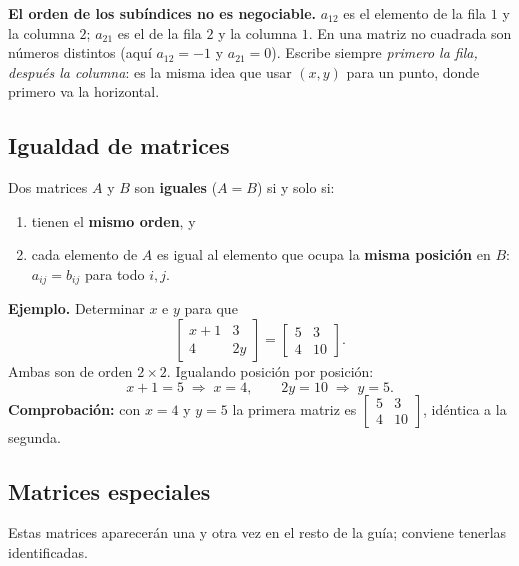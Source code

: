 \documentclass[12pt, letterpaper]{article}
\newcommand{\mwmat}[1]{\ensuremath{\begin{bmatrix}#1\end{bmatrix}}}
\begin{document}
\begin{cuadroadvertencia}
  \small
  \textbf{El orden de los subíndices no es negociable.} $a_{12}$ es el
  elemento de la fila $1$ y la columna $2$; $a_{21}$ es el de la fila $2$ y
  la columna $1$. En una matriz no cuadrada son números distintos (aquí
  $a_{12}=-1$ y $a_{21}=0$). Escribe siempre \emph{primero la fila, después
  la columna}: es la misma idea que usar $(x,y)$ para un punto, donde
  primero va la horizontal.
\end{cuadroadvertencia}

\subsection*{Igualdad de matrices}

\begin{cuadroteoria}
  \small
  Dos matrices $A$ y $B$ son \textbf{iguales} ($A=B$) si y solo si:
  \begin{enumerate}[leftmargin=1.4em, nosep]
    \item tienen el \textbf{mismo orden}, y
    \item cada elemento de $A$ es igual al elemento que ocupa la
          \textbf{misma posición} en $B$: $a_{ij}=b_{ij}$ para todo $i,j$.
  \end{enumerate}
\end{cuadroteoria}

\begin{cuadrosolucion}
  \small
  \textbf{Ejemplo.} Determinar $x$ e $y$ para que
  \[
    \mwmat{x+1 & 3\\ 4 & 2y}=\mwmat{5 & 3\\ 4 & 10}.
  \]
  Ambas son de orden $2\times2$. Igualando posición por posición:
  \[
    x+1=5\;\Rightarrow\;x=4,
    \qquad 2y=10\;\Rightarrow\;y=5.
  \]
  \textbf{Comprobación:} con $x=4$ y $y=5$ la primera matriz es
  $\mwmat{5&3\\4&10}$, idéntica a la segunda.
\end{cuadrosolucion}

\subsection*{Matrices especiales}

Estas matrices aparecerán una y otra vez en el resto de la guía; conviene
tenerlas identificadas.
\end{document}
